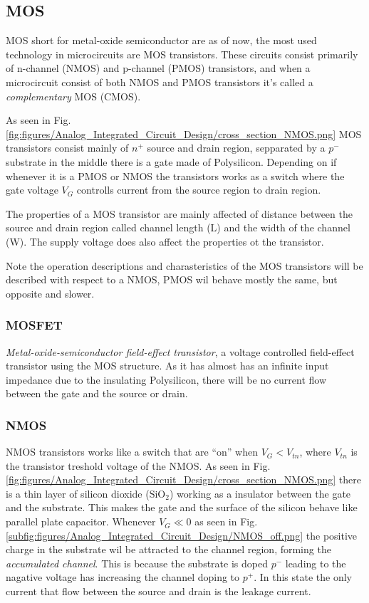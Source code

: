 \subsection{MOS}
MOS short for metal-oxide semiconductor are as of now, the most used technology in microcircuits are MOS transistors. These circuits consist primarily of n-channel (NMOS) and p-channel (PMOS) transistors, and when a microcircuit consist of both NMOS and PMOS transistors it's called a \textit{complementary} MOS (CMOS).\cite[p. 14]{carusone_2012_analog}


As seen in Fig. \ref{fig:figures/Analog_Integrated_Circuit_Design/cross_section_NMOS.png} MOS transistors consist mainly of $n^+$ source and drain region, sepparated by a $p^-$ substrate in the middle there is a gate made of Polysilicon. Depending on if whenever it is a PMOS or NMOS the transistors works as a switch where the gate voltage $V_G$ controlls current from the source region to drain region. 

The properties of a MOS transistor are mainly affected of distance between the source and drain region called channel length (L) and the width of the channel (W). The supply voltage does also affect the properties ot the transistor. 

Note the operation descriptions and charasteristics of the MOS transistors will be described with respect to a NMOS, PMOS wil behave mostly the same, but opposite and slower.

\subsubsection{MOSFET}
\textit{Metal-oxide-semiconductor field-effect transistor}, a voltage controlled field-effect transistor using the MOS structure. As it has almost has an infinite input impedance due to the insulating Polysilicon, there will be no current flow between the gate and the source or drain.


\subsubsection{NMOS}
NMOS transistors works like a switch that are ``on'' when $V_G < V_{tn}$, where $V_{tn}$ is the transistor treshold voltage of the NMOS. As seen in Fig. \ref{fig:figures/Analog_Integrated_Circuit_Design/cross_section_NMOS.png} there is a thin layer of silicon dioxide ($\text{SiO}_2$) working as a insulator between the gate and the substrate. This makes the gate and the surface of the silicon behave like parallel plate capacitor. Whenever $V_G\ll0$ as seen in Fig. \ref{subfig:figures/Analog_Integrated_Circuit_Design/NMOS_off.png} the positive charge in the substrate wil be attracted to the channel region, forming the \textit{accumulated channel}. This is because the substrate is doped $p^-$ leading to the nagative voltage has increasing the channel doping to $p^+$. In this state the only current that flow between the source and drain is the leakage current.

